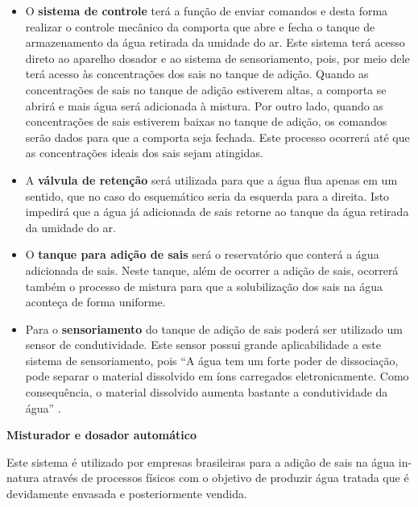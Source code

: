   \begin{itemize}
   
   \item O \textbf{sistema de controle} terá a função de enviar comandos e desta forma realizar o controle mecânico da comporta 
   que abre e fecha o tanque de armazenamento da água retirada da umidade do ar. Este sistema terá acesso direto ao aparelho
   dosador e ao sistema de sensoriamento, pois, por meio dele terá acesso às concentrações dos sais no tanque de adição. 
   Quando as concentrações de sais no tanque de adição estiverem altas, a comporta se abrirá e mais água será adicionada à 
   mistura. Por outro lado, quando as concentrações de sais estiverem baixas no tanque de adição, os comandos serão dados
   para que a comporta seja fechada. Este processo ocorrerá até que as concentrações ideais dos sais sejam atingidas.
   
   \item A \textbf{válvula de retenção} será utilizada para que a água flua apenas em um sentido, que no caso do esquemático 
   seria da esquerda para a direita. Isto impedirá que a água já adicionada de sais retorne ao tanque da água retirada da
   umidade do ar.
   
   \item O \textbf{tanque para adição de sais} será o reservatório que conterá a água adicionada de sais. Neste tanque, além
   de ocorrer a adição de sais, ocorrerá também o processo de mistura para que a solubilização dos sais na água aconteça de
   forma uniforme.
   
   \item Para o \textbf{sensoriamento} do tanque de adição de sais poderá ser utilizado um sensor de condutividade.
   Este sensor possui grande aplicabilidade a este sistema de sensoriamento, pois “A água tem um forte poder de dissociação,
   pode separar o material dissolvido em íons carregados eletronicamente. Como consequência, o material dissolvido aumenta
   bastante a condutividade da água” \cite{abilio05}.
   
  \end{itemize}
  
\begin{center}
\textbf{Misturador e dosador automático}
\end{center}

Este sistema é utilizado por empresas brasileiras para a adição de sais na água in-natura através de processos
físicos com o objetivo de produzir água tratada que é devidamente envasada e posteriormente vendida.

